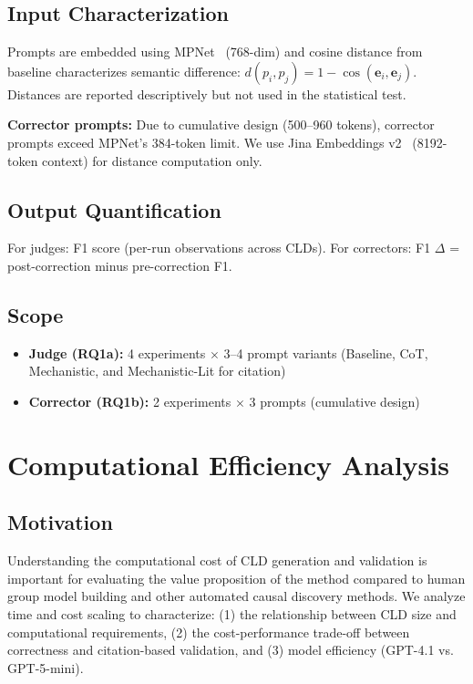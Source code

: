 \subsection{Input Characterization}
Prompts are embedded using MPNet~\cite{reimers2019sentencebert} (768-dim) and cosine distance from baseline characterizes semantic difference: $d(p_i, p_j) = 1 - \cos(\mathbf{e}_i, \mathbf{e}_j)$. Distances are reported descriptively but not used in the statistical test.

\textbf{Corrector prompts:} Due to cumulative design (500--960 tokens), corrector prompts exceed MPNet's 384-token limit. We use Jina Embeddings v2~\cite{gunther2023jina} (8192-token context) for distance computation only.

\subsection{Output Quantification}
For judges: F1 score (per-run observations across CLDs). For correctors: F1 $\Delta$ = post-correction minus pre-correction F1.

\subsection{Scope}
\begin{itemize}[noitemsep]
    \item \textbf{Judge (RQ1a):} 4 experiments $\times$ 3--4 prompt variants (Baseline, CoT, Mechanistic, and Mechanistic-Lit for citation)
    \item \textbf{Corrector (RQ1b):} 2 experiments $\times$ 3 prompts (cumulative design)
\end{itemize}

\section{Computational Efficiency Analysis}

\subsection{Motivation}
Understanding the computational cost of CLD generation and validation is important for evaluating the value proposition of the method compared to human group model building and other automated causal discovery methods. We analyze time and cost scaling to characterize: (1) the relationship between CLD size and computational requirements, (2) the cost-performance trade-off between correctness and citation-based validation, and (3) model efficiency (GPT-4.1 vs. GPT-5-mini).

